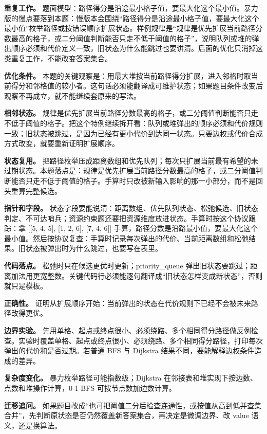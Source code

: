 \textbf{重复工作。} 题面模型：路径得分是沿途最小格子值，要最大化这个最小值。暴力版的慢点要落到本题：慢版本会围绕“路径得分是沿途最小格子值，要最大化这个最小值”枚举路径或按错误顺序扩展状态。样例规律是“规律是优先扩展当前路径分数最高的格子，或二分阈值判断能否只走不低于阈值的格子”，说明队列或堆的弹出顺序必须和代价定义一致，旧状态为什么能跳过也要讲清。后面的优化只消掉这类重复工作，不能改变答案集合。

\textbf{优化条件。} 本题的关键观察是：用最大堆按当前路径得分扩展，进入邻格时取当前得分和邻格值的较小者。这句话必须能翻译成可维护状态；如果题目条件改变后观察不再成立，就不能继续套原来的写法。

\textbf{相邻状态。} 规律是优先扩展当前路径分数最高的格子，或二分阈值判断能否只走不低于阈值的格子。把这个特例继续拆开看：队列或堆弹出的顺序必须和代价规则一致；旧状态被跳过，是因为已经有更小代价到达同一状态。只要边权或代价合成方式改变，就要重新证明扩展顺序。

\textbf{状态复用。} 把路径枚举压成距离数组和优先队列；每次只扩展当前最有希望的未过期状态。本题落点是：规律是优先扩展当前路径分数最高的格子，或二分阈值判断能否只走不低于阈值的格子。手算时只改被新输入影响的那一小部分，而不是回头重算完整候选。

\textbf{指针和字段。} 状态字段要能说清：距离数组、优先队列状态、松弛候选、旧状态判定、不可达哨兵；资源约束题还要把资源维度放进状态。手算时按这个协议跟踪：拿 [[5, 4, 5], [1, 2, 6], [7, 4, 6]] 手算，路径分数是沿路最小值，要最大化这个最小值。然后按协议复查：手算时记录每次弹出的代价、当前距离数组和松弛结果。旧状态被弹出时为什么跳过，也要写在表里。

\textbf{代码落点。} 松弛时只在候选更优时更新；priority\_queue 弹出旧状态要跳过；距离加法用更宽整数。关键代码行必须能逐句翻译成“旧状态怎样变成新状态”，否则就只是模板。

\textbf{正确性。} 证明从扩展顺序开始：当前弹出的状态在代价规则下已经不会被未来路径改得更优。

\textbf{边界实验。} 先用单格、起点或终点很小、必须绕路、多个相同得分路径做反例检查。实验时覆盖单格、起点或终点很小、必须绕路、多个相同得分路径，打印每次弹出的代价和是否过期。若普通 BFS 与 Dijkstra 结果不同，要能解释边权条件造成的差异。

\textbf{复杂度变化。} 暴力枚举路径可能指数级；Dijkstra 在邻接表和堆实现下按边数、点数和堆操作计算，0-1 BFS 可按节点数加边数计算。

\textbf{迁移追问。} 如果题目改成“也可把阈值二分后检查连通性，或按值从高到低并查集合并”，先判断原状态是否仍然覆盖新答案集合，再决定是微调边界、改 value 语义，还是换算法。

